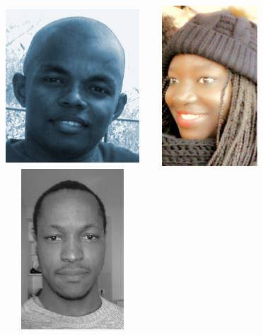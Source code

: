 \begin{titlepage}
\begin{center}
\begin {figure}[htbp]
{  
     \includegraphics[height=60mm,width=5cm]{Toilha}%
     \hspace*{0.125cm}  %
     \includegraphics[height=60mm,width=5cm]{vivi}%
     \hspace*{0.125cm}  %
     \includegraphics[height=60mm,width=5cm]{gf1}%

  }
\end {figure}
\end{center}

\par \vspace{2cm}



\end{titlepage}
